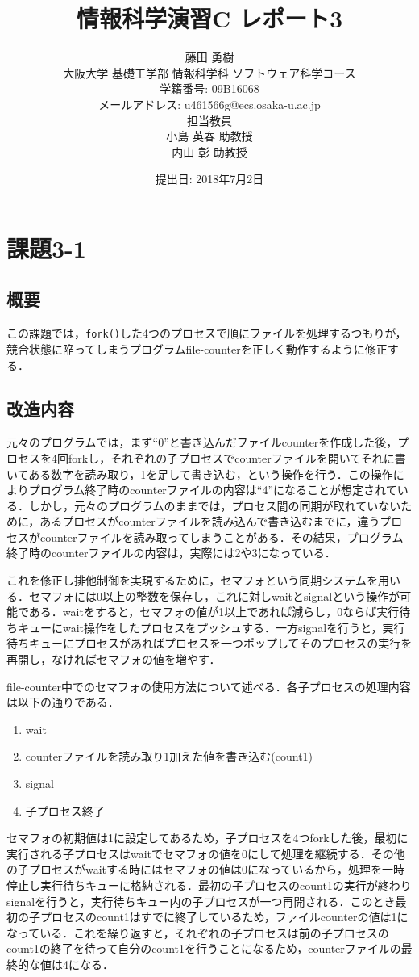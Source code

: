 \documentclass[a4j,10pt,titlepage]{jsarticle}
\title{情報科学演習C レポート3}
\author{藤田 勇樹 \\
大阪大学 基礎工学部 情報科学科 ソフトウェア科学コース\\
学籍番号: 09B16068 \\
メールアドレス: u461566g@ecs.osaka-u.ac.jp \\
担当教員\\
小島 英春 助教授 \\
内山 彰 助教授}
\date{提出日: 2018年7月2日}
\begin{document}
\maketitle
\section{課題3-1}
\subsection{概要}
この課題では，\verb|fork()|した4つのプロセスで順にファイルを処理するつもりが，競合状態に陥ってしまうプログラムfile-counterを正しく動作するように修正する．

\subsection{改造内容}
元々のプログラムでは，まず``0''と書き込んだファイルcounterを作成した後，プロセスを4回forkし，それぞれの子プロセスでcounterファイルを開いてそれに書いてある数字を読み取り，1を足して書き込む，という操作を行う．この操作によりプログラム終了時のcounterファイルの内容は``4''になることが想定されている．しかし，元々のプログラムのままでは，プロセス間の同期が取れていないために，あるプロセスがcounterファイルを読み込んで書き込むまでに，違うプロセスがcounterファイルを読み取ってしまうことがある．その結果，プログラム終了時のcounterファイルの内容は，実際には2や3になっている．

これを修正し排他制御を実現するために，セマフォという同期システムを用いる．セマフォには0以上の整数を保存し，これに対しwaitとsignalという操作が可能である．waitをすると，セマフォの値が1以上であれば減らし，0ならば実行待ちキューにwait操作をしたプロセスをプッシュする．一方signalを行うと，実行待ちキューにプロセスがあればプロセスを一つポップしてそのプロセスの実行を再開し，なければセマフォの値を増やす．

file-counter中でのセマフォの使用方法について述べる．各子プロセスの処理内容は以下の通りである．
\begin{enumerate}
  \item wait
  \item counterファイルを読み取り1加えた値を書き込む(count1)
  \item signal
  \item 子プロセス終了
\end{enumerate}

セマフォの初期値は1に設定してあるため，子プロセスを4つforkした後，最初に実行される子プロセスはwaitでセマフォの値を0にして処理を継続する．その他の子プロセスがwaitする時にはセマフォの値は0になっているから，処理を一時停止し実行待ちキューに格納される．最初の子プロセスのcount1の実行が終わりsignalを行うと，実行待ちキュー内の子プロセスが一つ再開される．このとき最初の子プロセスのcount1はすでに終了しているため，ファイルcounterの値は1になっている．これを繰り返すと，それぞれの子プロセスは前の子プロセスのcount1の終了を待って自分のcount1を行うことになるため，counterファイルの最終的な値は4になる．
\end{document}
